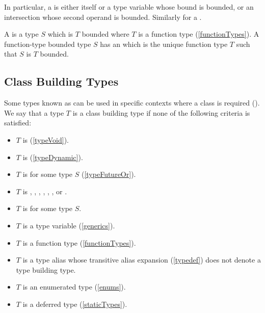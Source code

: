 \documentclass[makeidx]{article}
\begin{document}
{\LMHash{}%
In particular, a
is either \DYNAMIC{} itself
or a type variable whose bound is \DYNAMIC{} bounded,
or an intersection whose second operand is \DYNAMIC{} bounded.
Similarly for a
.

\LMHash{}%
A
is a type $S$ which is $T$ bounded where $T$ is a function type
(\ref{functionTypes}).
A function-type bounded type $S$ has an
which is the unique function type $T$ such that $S$ is $T$ bounded.


\subsection{Class Building Types}

\LMHash{}%
Some types known as
can be used in specific contexts where a class is required
().
We say that a type $T$ is a class building type
if none of the following criteria is satisfied:

\begin{itemize}
\item $T$ is \VOID{} (\ref{typeVoid}).
\item $T$ is \DYNAMIC{} (\ref{typeDynamic}).
\item $T$ is  for some type $S$ (\ref{typeFutureOr}).
\item
  $T$ is , , , , ,
  , or .
\item $T$ is  for some type $S$.
\item $T$ is a type variable (\ref{generics}).
\item $T$ is a function type (\ref{functionTypes}).
\item $T$ is a type alias whose transitive alias expansion
  (\ref{typedef}) does not denote a type building type.
\item $T$ is an enumerated type (\ref{enums}).
\item $T$ is a deferred type (\ref{staticTypes}).
\end{itemize}


}
\end{document}
